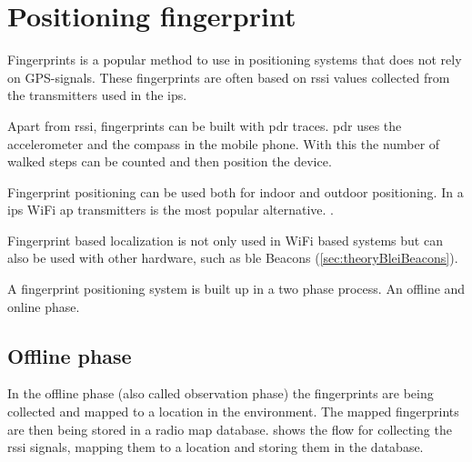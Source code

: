 \section{Positioning fingerprint}\label{sec:theoryFingerprint}
Fingerprints is a popular method to use in positioning systems that does not rely on GPS-signals.
These fingerprints are often based on \acrshort{rssi} values collected from the transmitters used in the \acrfull{ips}.
\cite{LocationFingerprintingInfrastructure2004, AutomaticConstructionRadio2018}

\bigskip

Apart from \acrshort{rssi}, fingerprints can be built with \acrfull{pdr} traces.
\acrshort{pdr} uses the accelerometer and the compass in the mobile phone.
With this the number of walked steps can be counted and then position the device.
\cite{AutomaticConstructionRadio2018, NoNeedWardrive2012}

\bigskip

Fingerprint positioning can be used both for indoor and outdoor positioning.
In a \acrshort{ips} WiFi \acrfull{ap} transmitters is the most popular alternative.
\cite{LocationFingerprintingInfrastructure2004,
IndoorFingerprintPositioning2017}.

\bigskip

Fingerprint based localization is not only used in WiFi based systems but can
also be used with other hardware, such as \acrlong{ble} Beacons (\cref{sec:theoryBleiBeacons}).
\cite{PracticalFingerprintingLocalization2017} 

\bigskip

A fingerprint positioning system is built up in a two phase process.  An offline
and online phase.\cite{IndoorFingerprintPositioning2017} 


\subsection{Offline phase}\label{sec:theoryFingerprintOffline}
In the offline phase (also called observation phase) the fingerprints are being collected and
mapped to a location in the environment.
The mapped fingerprints are then being stored in a radio map database.
 shows the flow for collecting the \acrshort{rssi} signals, mapping them to a location and storing them in the database.
\cite{IndoorFingerprintPositioning2017} 



